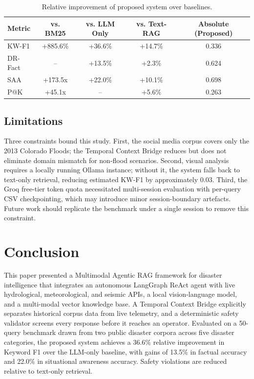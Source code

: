 \documentclass[conference]{IEEEtran}
\begin{document}
\begin{table}[ht]
\centering
\caption{Relative improvement of proposed system over baselines.}
\label{tab:comparison}
\renewcommand{\arraystretch}{1.2}
\setlength{\tabcolsep}{4pt}
\begin{tabular}{@{}lcccc@{}}
\toprule
\textbf{Metric} &
  \textbf{vs. BM25} &
  \textbf{vs. LLM Only} &
  \textbf{vs. Text-RAG} &
  \textbf{Absolute (Proposed)} \\ \midrule
KW-F1   & +885.6\% & +36.6\% & +14.7\% & 0.336 \\
DR-Fact & --       & +13.5\% & +2.3\%  & 0.624 \\
SAA     & +173.5x  & +22.0\% & +10.1\% & 0.698 \\
P@K     & +45.1x   & --      & +5.6\%  & 0.263 \\ \bottomrule
\end{tabular}
\end{table}

\subsection{Limitations}

Three constraints bound this study. First, the social media corpus covers only
the 2013 Colorado Floods; the Temporal Context Bridge reduces but does not
eliminate domain mismatch for non-flood scenarios. Second, visual analysis
requires a locally running Ollama instance; without it, the system falls back
to text-only retrieval, reducing estimated KW-F1 by approximately 0.03.
Third, the Groq free-tier token quota necessitated multi-session evaluation
with per-query CSV checkpointing, which may introduce minor session-boundary
artefacts. Future work should replicate the benchmark under a single session
to remove this constraint.

\section{Conclusion}

This paper presented a Multimodal Agentic RAG framework for disaster
intelligence that integrates an autonomous LangGraph ReAct agent with live
hydrological, meteorological, and seismic APIs, a local vision-language model,
and a multi-modal vector knowledge base. A Temporal Context Bridge explicitly
separates historical corpus data from live telemetry, and a deterministic
safety validator screens every response before it reaches an operator. Evaluated
on a 50-query benchmark drawn from two public disaster corpora across five
disaster categories, the proposed system achieves a 36.6\% relative improvement
in Keyword F1 over the LLM-only baseline, with gains of 13.5\% in factual
accuracy and 22.0\% in situational awareness accuracy. Safety violations are
reduced relative to text-only retrieval.
\end{document}
